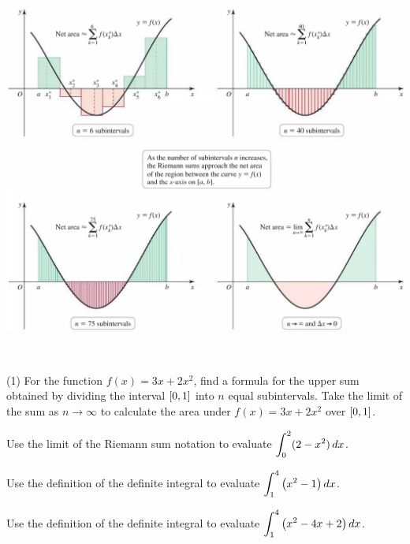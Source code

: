 \documentclass[mathNotesPreamble]{subfiles}
\begin{document}
\begin{center}
  \includegraphics[width=0.85\linewidth]{images/briggs_05_02/fig5_20.png}
\end{center}
\pagebreak
\begin{ex*}~

  \begin{tasks}[after-item-skip=\stretch{1}](1)
    \task 
      For the function $f(x)=3x+2x^2$, find a formula for the upper sum obtained by dividing the interval ${\left[0,1\right]}$ into $n$ equal subintervals.
    \task 
      Take the limit of the sum as $n\to\infty$ to calculate the area under $f(x)=3x+2x^2$ over ${\left[0,1\right]}$.
  \end{tasks}
\end{ex*}
\pagebreak

\begin{ex*}
  Use the limit of the Riemann sum notation to evaluate $\displaystyle\int_0^2 (2-x^2)\,dx$.
\end{ex*}
\begin{ex*}
  Use the definition of the definite integral to evaluate $\displaystyle\int_1^4 {\left(x^2-1\right)}\,dx$.
\end{ex*}
\pagebreak

\begin{ex*}
  Use the definition of the definite integral to evaluate $\displaystyle\int_1^4 {\left(x^2-4x+2\right)}\,dx$.
\end{ex*}
\end{document}
